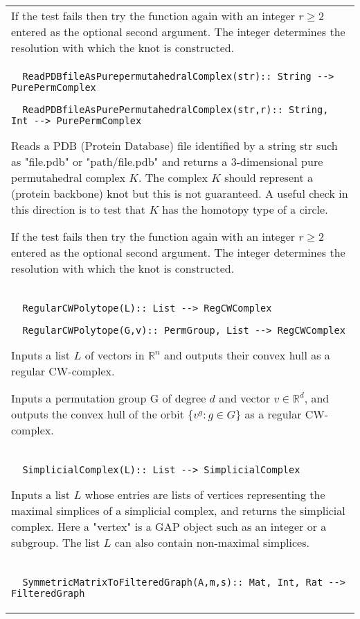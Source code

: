 \documentclass[a4paper,11pt]{report}
\begin{document}
{\begin{center}
\begin{tabular}{|l|}
If the test fails then try the function again with an integer $r \ge 2$ entered as the optional second argument. The integer determines the resolution
with which the knot is constructed. \\
 \index{ReadPDBfileAsPurePermutahedralComplex} 
\begin{verbatim}  ReadPDBfileAsPurepermutahedralComplex(str):: String --> PurePermComplex
\end{verbatim}
 
\begin{verbatim}  ReadPDBfileAsPurePermutahedralComplex(str,r):: String, Int --> PurePermComplex
\end{verbatim}


 

 Reads a PDB (Protein Database) file identified by a string str such as
"file.pdb" or "path/file.pdb" and returns a $3$-dimensional pure permutahedral complex $K$. The complex $K$ should represent a (protein backbone) knot but this is not guaranteed. A
useful check in this direction is to test that $K$ has the homotopy type of a circle. 

If the test fails then try the function again with an integer $r \ge 2$ entered as the optional second argument. The integer determines the resolution
with which the knot is constructed. \\
 \index{RegularCWPolytope} 
\begin{verbatim}  RegularCWPolytope(L):: List --> RegCWComplex
\end{verbatim}
 
\begin{verbatim}  RegularCWPolytope(G,v):: PermGroup, List --> RegCWComplex
\end{verbatim}


 

 Inputs a list $L$ of vectors in $\mathbb R^n$ and outputs their convex hull as a regular CW-complex. 

 Inputs a permutation group G of degree $d$ and vector $v\in \mathbb R^d$, and outputs the convex hull of the orbit $\{v^g : g\in G\}$ as a regular CW-complex. \\
 \index{SimplicialComplex} 
\begin{verbatim}  SimplicialComplex(L):: List --> SimplicialComplex
\end{verbatim}


 

Inputs a list $L$ whose entries are lists of vertices representing the maximal simplices of a
simplicial complex, and returns the simplicial complex. Here a "vertex" is a
GAP object such as an integer or a subgroup. The list $L$ can also contain non-maximal simplices. \\
 \index{SymmetricMatrixToFilteredGraph} 
\begin{verbatim}  SymmetricMatrixToFilteredGraph(A,m,s):: Mat, Int, Rat --> FilteredGraph
\end{verbatim}
 

\end{tabular}
\end{center}}
\end{document}
